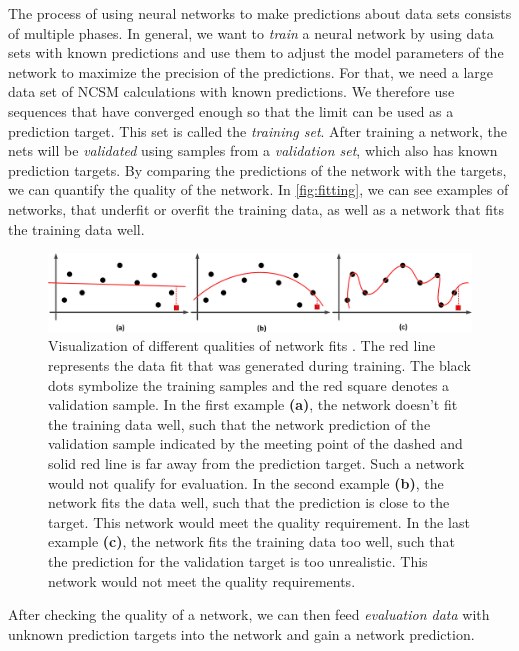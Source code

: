 The process of using neural networks to make predictions about data sets consists of multiple phases.
In general, we want to \textit{train} a neural network by using data sets with known predictions and use them to adjust the model parameters of the network to maximize the precision of the predictions. For that, we need a large data set of NCSM calculations with known predictions. We therefore use sequences that have converged enough so that the limit can be used as a prediction target. This set is called the \textit{training set}.
After training a network, the nets will be \textit{validated} using samples from a \textit{validation set}, which also has known prediction targets. By comparing the predictions of the network with the targets, we can quantify the quality of the network. In \autoref{fig:fitting}, we can see examples of networks, that underfit or overfit the training data, as well as a network that fits the training data well.

\begin{figure}[H]
  \includegraphics[width=\linewidth]{media/networkquality.png}
  \caption{Visualization of different qualities of network fits \cite{underfit}. The red line represents the data fit that was generated during training. The black dots symbolize the training samples and the red square denotes a validation sample. In the first example \textbf{(a)}, the network doesn't fit the training data well, such that the network prediction of the validation sample indicated by the meeting point of the dashed and solid red line is far away from the prediction target. Such a network would not qualify for evaluation. In the second example \textbf{(b)}, the network fits the data well, such that the prediction is close to the target. This network would meet the quality requirement. In the last example \textbf{(c)}, the network fits the training data too well, such that the prediction for the validation target is too unrealistic. This network would not meet the quality requirements.}
  \label{fig:fitting}
\end{figure}

After checking the quality of a network, we can then feed \textit{evaluation data} with unknown prediction targets into the network and gain a network prediction.

